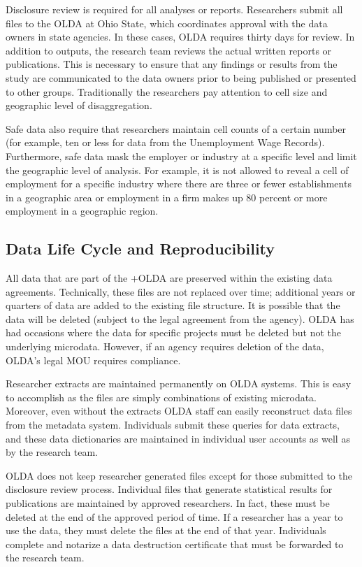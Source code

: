 \documentclass[
]{WileySix}
\begin{document}
Disclosure review is required for all analyses or reports. Researchers submit all files to the OLDA at Ohio State, which coordinates approval with the data owners in state agencies. In these cases, OLDA requires thirty days for review. In addition to outputs, the research team reviews the actual written reports or publications. This is necessary to ensure that any findings or results from the study are communicated to the data owners prior to being published or presented to other groups. Traditionally the researchers pay attention to cell size and geographic level of disaggregation.

Safe data also require that researchers maintain cell counts of a certain number (for example, ten or less for data from the Unemployment Wage Records). Furthermore, safe data mask the employer or industry at a specific level and limit the geographic level of analysis. For example, it is not allowed to reveal a cell of employment for a specific industry where there are three or fewer establishments in a geographic area or employment in a firm makes up 80 percent or more employment in a geographic region.

\hypertarget{data-life-cycle-and-reproducibility}{%
\subsection{Data Life Cycle and Reproducibility}\label{data-life-cycle-and-reproducibility}}

All data that are part of the +OLDA\textbar{} are preserved within the existing data agreements. Technically, these files are not replaced over time; additional years or quarters of data are added to the existing file structure. It is possible that the data will be deleted (subject to the legal agreement from the agency). OLDA has had occasions where the data for specific projects must be deleted but not the underlying microdata. However, if an agency requires deletion of the data, OLDA's legal MOU requires compliance.

Researcher extracts are maintained permanently on OLDA systems. This is easy to accomplish as the files are simply combinations of existing microdata. Moreover, even without the extracts OLDA staff can easily reconstruct data files from the metadata system. Individuals submit these queries for data extracts, and these data dictionaries are maintained in individual user accounts as well as by the research team.

OLDA does not keep researcher generated files except for those submitted to the disclosure review process. Individual files that generate statistical results for publications are maintained by approved researchers. In fact, these must be deleted at the end of the approved period of time. If a researcher has a year to use the data, they must delete the files at the end of that year. Individuals complete and notarize a data destruction certificate that must be forwarded to the research team.
\end{document}

